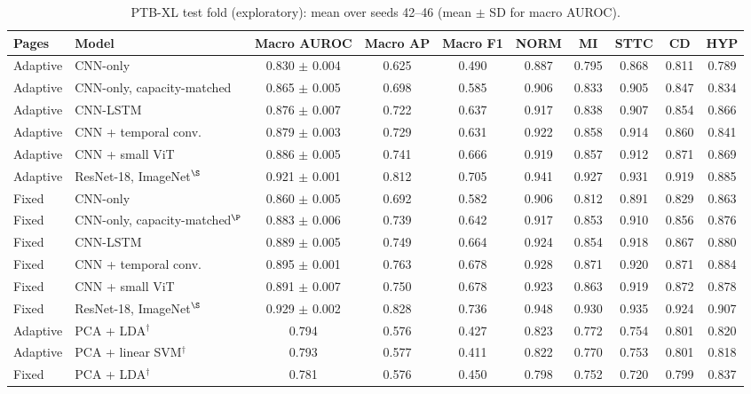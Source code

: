 \documentclass{wlscirep}
\begin{document}
\begin{table}[!t]
\centering
\caption{PTB-XL test fold (exploratory): mean over seeds 42--46 (mean $\pm$ SD for macro AUROC).}
\label{tab:ptbxl}
\footnotesize
\begin{tabular}{llcccccccc}
\toprule
Pages & Model & Macro AUROC & Macro AP & Macro F1 & NORM & MI & STTC & CD & HYP \\
\midrule
Adaptive & CNN-only & 0.830 $\pm$ 0.004 & 0.625 & 0.490 & 0.887 & 0.795 & 0.868 & 0.811 & 0.789 \\
Adaptive & CNN-only, capacity-matched & 0.865 $\pm$ 0.005 & 0.698 & 0.585 & 0.906 & 0.833 & 0.905 & 0.847 & 0.834 \\
Adaptive & CNN-LSTM & 0.876 $\pm$ 0.007 & 0.722 & 0.637 & 0.917 & 0.838 & 0.907 & 0.854 & 0.866 \\
Adaptive & CNN + temporal conv. & 0.879 $\pm$ 0.003 & 0.729 & 0.631 & 0.922 & 0.858 & 0.914 & 0.860 & 0.841 \\
Adaptive & CNN + small ViT & 0.886 $\pm$ 0.005 & 0.741 & 0.666 & 0.919 & 0.857 & 0.912 & 0.871 & 0.869 \\
Adaptive & ResNet-18, ImageNet$^\S$ & 0.921 $\pm$ 0.001 & 0.812 & 0.705 & 0.941 & 0.927 & 0.931 & 0.919 & 0.885 \\
\midrule
Fixed & CNN-only & 0.860 $\pm$ 0.005 & 0.692 & 0.582 & 0.906 & 0.812 & 0.891 & 0.829 & 0.863 \\
Fixed & CNN-only, capacity-matched$^\P$ & 0.883 $\pm$ 0.006 & 0.739 & 0.642 & 0.917 & 0.853 & 0.910 & 0.856 & 0.876 \\
Fixed & CNN-LSTM & 0.889 $\pm$ 0.005 & 0.749 & 0.664 & 0.924 & 0.854 & 0.918 & 0.867 & 0.880 \\
Fixed & CNN + temporal conv. & 0.895 $\pm$ 0.001 & 0.763 & 0.678 & 0.928 & 0.871 & 0.920 & 0.871 & 0.884 \\
Fixed & CNN + small ViT & 0.891 $\pm$ 0.007 & 0.750 & 0.678 & 0.923 & 0.863 & 0.919 & 0.872 & 0.878 \\
Fixed & ResNet-18, ImageNet$^\S$ & 0.929 $\pm$ 0.002 & 0.828 & 0.736 & 0.948 & 0.930 & 0.935 & 0.924 & 0.907 \\
\midrule
Adaptive & PCA + LDA$^\dagger$ & 0.794 & 0.576 & 0.427 & 0.823 & 0.772 & 0.754 & 0.801 & 0.820 \\
Adaptive & PCA + linear SVM$^\dagger$ & 0.793 & 0.577 & 0.411 & 0.822 & 0.770 & 0.753 & 0.801 & 0.818 \\
\midrule
Fixed & PCA + LDA$^\dagger$ & 0.781 & 0.576 & 0.450 & 0.798 & 0.752 & 0.720 & 0.799 & 0.837 \\

\end{tabular}
\end{table}
\end{document}
